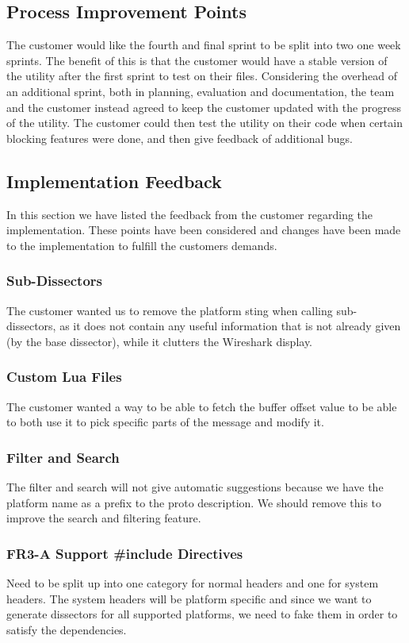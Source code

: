 \subsection{Process Improvement Points}
The customer would like the fourth and final sprint to be split into two one week sprints. The benefit of this is that the customer would have a stable version of the utility after the first sprint to test on their files. Considering the overhead of an additional sprint, both in planning, evaluation and documentation, the team and the customer instead agreed to keep the customer updated with the progress of the utility. The customer could then test the utility on their code when certain blocking features were done, and then give feedback of additional bugs.
\subsection{Implementation Feedback}
In this section we have listed the feedback from the customer regarding the implementation. These points have been considered and changes have been made to the implementation to fulfill the customers demands.
\subsubsection{Sub-Dissectors}
The customer wanted us to remove the platform sting when calling sub-dissectors, as it does not contain any useful information that is not already given (by the base dissector), while it clutters the Wireshark display.
\subsubsection{Custom Lua Files}
The customer wanted a way to be able to fetch the buffer offset value to be able to both use it to pick specific parts of the message and modify it.
\subsubsection{Filter and Search}
The filter and search will not give automatic suggestions because we have the platform name as a prefix to the proto description. We should remove this to improve the search and filtering feature.
\subsubsection{FR3-A Support \#include Directives}
Need to be split up into one category for normal headers and one for system headers. The system headers will be platform specific and since we want to generate dissectors for all supported platforms, we need to fake them in order to satisfy the dependencies.
